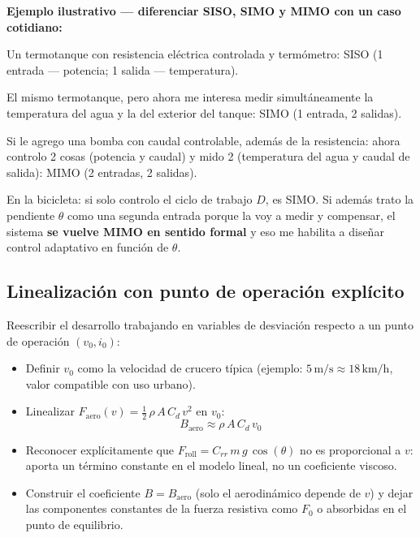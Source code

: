 \documentclass[11pt,a4paper]{article}
\newcommand{\unit}[1]{\,\mathrm{#1}}
\begin{document}
\begin{ejemplo}
\textbf{Ejemplo ilustrativo --- diferenciar SISO, SIMO y MIMO con un caso cotidiano:}

Un termotanque con resistencia eléctrica controlada y termómetro: SISO (1 entrada --- potencia; 1 salida --- temperatura).

El mismo termotanque, pero ahora me interesa medir simultáneamente la temperatura del agua y la del exterior del tanque: SIMO (1 entrada, 2 salidas).

Si le agrego una bomba con caudal controlable, además de la resistencia: ahora controlo 2 cosas (potencia y caudal) y mido 2 (temperatura del agua y caudal de salida): MIMO (2 entradas, 2 salidas).

En la bicicleta: si solo controlo el ciclo de trabajo $D$, es SIMO. Si además trato la pendiente $\theta$ como una segunda entrada porque la voy a medir y compensar, el sistema \textbf{se vuelve MIMO en sentido formal} y eso me habilita a diseñar control adaptativo en función de $\theta$.
\end{ejemplo}

\subsection{Linealización con punto de operación explícito}

Reescribir el desarrollo trabajando en variables de desviación respecto a un punto de operación $(v_0, i_0)$:

\begin{itemize}
    \item Definir $v_0$ como la velocidad de crucero típica (ejemplo: $5\unit{m/s} \approx 18\unit{km/h}$, valor compatible con uso urbano).
    \item Linealizar $F_{\text{aero}}(v) = \tfrac{1}{2}\,\rho\,A\,C_d\,v^2$ en $v_0$:
    \begin{equation}
    B_{\text{aero}} \approx \rho\,A\,C_d\,v_0
    \end{equation}
    \item Reconocer explícitamente que $F_{\text{roll}} = C_{rr}\,m\,g\,\cos(\theta)$ no es proporcional a $v$: aporta un término constante en el modelo lineal, no un coeficiente viscoso.
    \item Construir el coeficiente $B = B_{\text{aero}}$ (solo el aerodinámico depende de $v$) y dejar las componentes constantes de la fuerza resistiva como $F_0$ o absorbidas en el punto de equilibrio.
\end{itemize}
\end{document}
